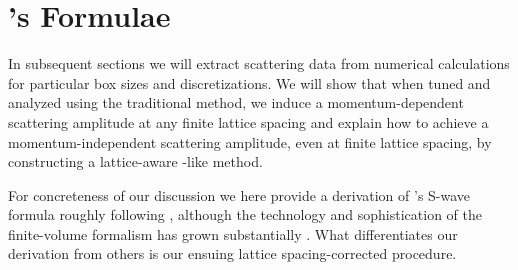 \section{\Luscher's Formulae}\label{sec:luescher}

In subsequent sections we will extract scattering data from numerical calculations for particular box sizes and discretizations.
We will show that when tuned and analyzed using the traditional \Luscher method, we induce a momentum-dependent scattering amplitude at any finite lattice spacing and explain how to achieve a momentum-independent scattering amplitude, even at finite lattice spacing, by constructing a lattice-aware \Luscher-like method.

For concreteness of our discussion we here provide a derivation of \Luscher's S-wave formula roughly following , although the technology and sophistication of the finite-volume formalism has grown substantially \cite{Ozaki:2012ce,Hansen:2012tf,Briceno:2013hya,Briceno:2013lba,Li:2014wga,Zhu:2019dho}. What differentiates our derivation from others is our ensuing lattice spacing-corrected procedure.



